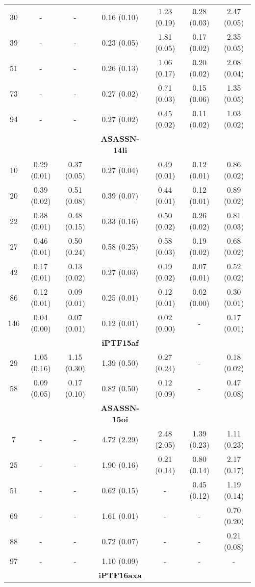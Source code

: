 \documentclass[structabstract]{aa}
\begin{document}
\begin{small}
\begin{longtable}{c c c c c c c}
30	&	-	&	-	&	0.16 (0.10)	&	1.23 (0.19)	&	0.28 (0.03)	&	2.47 (0.05)  \\
39	&	-	&	-	&	0.23 (0.05)	&	1.81 (0.05)	&	0.17 (0.02)	&	2.35 (0.05)  \\
51	&	-	&	-	&	0.26 (0.13)	&	1.06 (0.17)	&	0.20 (0.02)	&	2.08 (0.04)  \\
73	&	-	&	-	&	0.27 (0.02)	&	0.71 (0.03)	&	0.15 (0.06)	&	1.35 (0.05)  \\
94	&	-	&	-	&	0.27 (0.02)	&	0.45 (0.02)	&	0.11 (0.02)	&	1.03 (0.02)  \\ \hline
	&		&		&	\textbf{ASASSN-14li}	&		&		&	\\ \hline
10	&	0.29 (0.01)	&	0.37 (0.05)	&	0.27 (0.04)	&	0.49 (0.01)	&	0.12 (0.01)	&	0.86 (0.02)  \\
20	&	0.39 (0.02)	&	0.51 (0.08)	&	0.39 (0.07)	&	0.44 (0.01)	&	0.12 (0.01)	&	0.89 (0.02)  \\
22	&	0.38 (0.01)	&	0.48 (0.15)	&	0.33 (0.16)	&	0.50 (0.02)	&	0.26 (0.02)	&	0.81 (0.03)  \\
27	&	0.46 (0.01)	&	0.50 (0.24)	&	0.58 (0.25)	&	0.58 (0.03)	&	0.19 (0.02)	&	0.68 (0.02)  \\
42	&	0.17 (0.01)	&	0.13 (0.02)	&	0.27 (0.03)	&	0.19 (0.02)	&	0.07 (0.01)	&	0.52 (0.02)  \\
86	&	0.12 (0.01)	&	0.09 (0.01)	&	0.25 (0.01)	&	0.12 (0.01)	&	0.02 (0.00)	&	0.30 (0.01)  \\
146	&	0.04 (0.00)	&	0.07 (0.01)	&	0.12 (0.01)	&	0.02 (0.00)	&	-	&	0.17 (0.01)  \\ \hline
	&		&		&	\textbf{iPTF15af}	&		&		&	\\ \hline
29	&	1.05 (0.16)	&	1.15 (0.30)	&	1.39 (0.50)	&	0.27 (0.24)	&	-	&	0.18 (0.02)  \\
58	&	0.09 (0.05)	&	0.17 (0.10)	&	0.82 (0.50)	&	0.12 (0.09)	&	-	&	0.47 (0.08)  \\ \hline
	&		&		&	\textbf{ASASSN-15oi}	&		&		&	\\ \hline
7	&	-	&	-	&	4.72 (2.29)	&	2.48 (2.05)	&	1.39 (0.23)	&	1.11 (0.23)  \\
25	&	-	&	-	&	1.90 (0.16)	&	0.21 (0.14)	&	0.80 (0.14)	&	2.17 (0.17)  \\
51	&	-	&	-	&	0.62 (0.15)	&	-	&	0.45 (0.12)	&	1.19 (0.14)  \\
69	&	-	&	-	&	1.61 (0.01)	&	-	&	-	&	0.70 (0.20)  \\
88	&	-	&	-	&	0.72 (0.07)	&	-	&	-	&	0.21 (0.08)  \\
97	&	-	&	-	&	1.10 (0.09)	&	-	&	-	&	-                  \\ \hline
	&		&		&	\textbf{iPTF16axa}	&		&		&	\\ \hline

\end{longtable}
\end{small}
\end{document}
